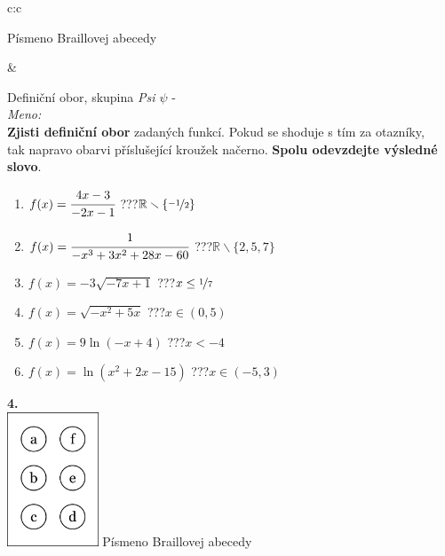 \documentclass[10pt]{report}
\begin{document}
\begin{tabular}{c:c}
\begin{minipage}[c][99mm][t]{0.49\linewidth}
\begin{center}
\begin{minipage}{0.20\linewidth}
\begin{center}
{\small Písmeno Braillovej abecedy}
\end{center}
\end{minipage}
\end{center}
\end{minipage}
&
\begin{minipage}[c][99mm][t]{0.49\linewidth}
\begin{center}
\vspace{7mm}
{\huge Definiční obor, skupina \textit{Psi $\psi$} -}\\[4.5mm]
\textit{Meno:}\phantom{xxxxxxxxxxxxxxxxxxxxxxxxxxxxxxxxxxxxxxxxxxxxxxxxxxxxxxxxxxxxxxxxx}\\[3.5mm]
\textbf{Zjisti definiční obor} zadaných funkcí. Pokud se shoduje s tím za otazníky,\\tak napravo obarvi příslušející kroužek načerno. \textbf{Spolu odevzdejte výsledné slovo}.\\[3mm]
\begin{minipage}{0.77\linewidth}
\begin{center}
\begin{varwidth}{\textwidth}
\begin{enumerate}
\normalsize
\item $f(x)=\cfrac{4x-3}{-2x-1}$\quad \dotfill\; ???\;\dotfill \quad $\mathbb{R}\smallsetminus\{\nicefrac{-1}{2}\}$
\item $f(x)=\cfrac{1}{-x^3+3x^2+28x-60}$\quad \dotfill\; ???\;\dotfill \quad $\mathbb{R}\smallsetminus\{2,5,7\}$
\item $f(x)=-3\sqrt{-7x+1}$\quad \dotfill\; ???\;\dotfill \quad $x\leq\nicefrac{1}{7}$
\item $f(x)=\sqrt{-x^2+5x}$\quad \dotfill\; ???\;\dotfill \quad $x\in(0 , 5)$
\item $f(x)=9\ln{(-x+4)}$\quad \dotfill\; ???\;\dotfill \quad $x<-4$
\item $f(x)=\ln{(x^2+2x-15)}$\quad \dotfill\; ???\;\dotfill \quad $x\in(-5 , 3)$
\end{enumerate}
\end{varwidth}
\end{center}
\end{minipage}
\begin{minipage}{0.20\linewidth}
\begin{center}
{\Huge\bfseries 4.} \\[2mm]
\includegraphics[height=40mm]{../images/braille.png}
{\small Písmeno Braillovej abecedy}
\end{center}
\end{minipage}
\end{center}
\end{minipage}
%
\end{tabular}
\end{document}
